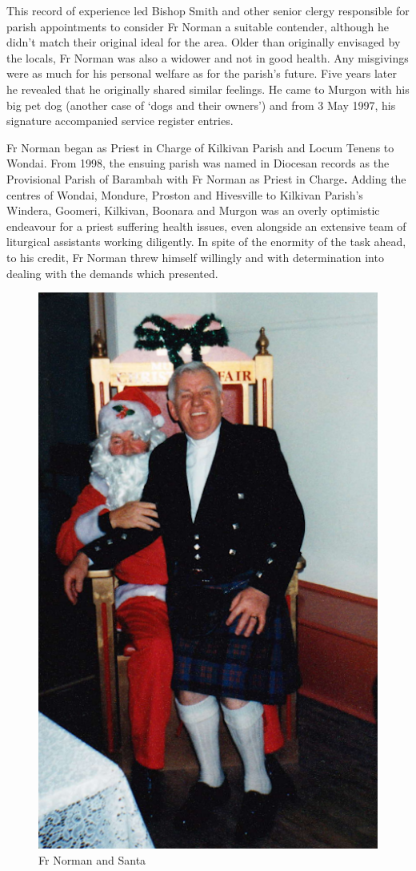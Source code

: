 This record of experience led Bishop Smith and other senior clergy responsible for parish appointments to consider Fr Norman a suitable contender, although he didn't match their original ideal for the area. Older than originally envisaged by the locals, Fr Norman was also a widower and not in good health. Any misgivings were as much for his personal welfare as for the parish's future. Five years later he revealed that he originally shared similar feelings. He came to Murgon with his big pet dog (another case of `dogs and their owners') and from 3 May 1997, his signature accompanied service register entries.



Fr Norman began as Priest in Charge of Kilkivan Parish and Locum Tenens to Wondai. From 1998, the ensuing parish was named in Diocesan records as the Provisional Parish of Barambah with Fr Norman as Priest in Charge\textbf{.} Adding the centres of Wondai, Mondure, Proston and Hivesville to Kilkivan Parish's Windera, Goomeri, Kilkivan, Boonara and Murgon was an overly optimistic endeavour for a priest suffering health issues, even alongside an extensive team of liturgical assistants working diligently. In spite of the enormity of the task ahead, to his credit, Fr Norman threw himself willingly and with determination into dealing with the demands which presented.









\begin{figure}
\begin{center}
\includegraphics[width=.7\linewidth,center]{../images/frNormanSanta.png}
\caption{Fr Norman and Santa}
\end{center}
\end{figure}




